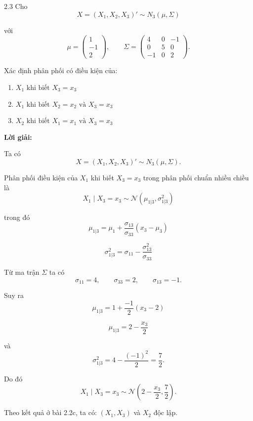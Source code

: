 \begin{question}{2.3}
Cho
\[
X = (X_1, X_2, X_3)' \sim N_3(\mu, \Sigma)
\]

với
\[
\mu =
\begin{pmatrix}
1\\
-1\\
2
\end{pmatrix},
\qquad
\Sigma =
\begin{pmatrix}
4 & 0 & -1\\
0 & 5 & 0\\
-1 & 0 & 2
\end{pmatrix}.
\]

Xác định phân phối có điều kiện của:

\begin{enumerate}
\item[(a)] $X_1 \text{ khi biết } X_3 = x_3$
\item[(b)] $X_1 \text{ khi biết } X_2 = x_2 \text{ và } X_3 = x_3$
\item[(c)] $X_2 \text{ khi biết } X_1 = x_1 \text{ và } X_3 = x_3$
\end{enumerate}

\textbf{Lời giải:}

\begin{subquestion}
\begin{answer}
Ta có
\[
X = (X_1, X_2, X_3)' \sim N_3(\mu,\Sigma).
\]

Phân phối điều kiện của $X_1$ khi biết $X_3=x_3$ trong phân phối chuẩn nhiều chiều là
\[
X_1 \mid X_3 = x_3 \sim \mathcal{N}(\mu_{1|3}, \sigma^2_{1|3})
\]

trong đó
\[
\mu_{1|3} = \mu_1 + \frac{\sigma_{13}}{\sigma_{33}}(x_3 - \mu_3)
\]

\[
\sigma^2_{1|3} = \sigma_{11} - \frac{\sigma_{13}^2}{\sigma_{33}}
\]

Từ ma trận $\Sigma$ ta có
\[
\sigma_{11}=4, \qquad \sigma_{33}=2, \qquad \sigma_{13}=-1.
\]

Suy ra
\[
\mu_{1|3} = 1 + \frac{-1}{2}(x_3-2)
\]

\[
\mu_{1|3} = 2 - \frac{x_3}{2}
\]

và
\[
\sigma^2_{1|3} = 4 - \frac{(-1)^2}{2} = \frac{7}{2}.
\]

Do đó
\[
X_1 \mid X_3 = x_3 \sim \mathcal{N}\left(2-\frac{x_3}{2}, \frac{7}{2}\right).
\]
\end{answer}
\end{subquestion} 

\begin{subquestion}
\begin{answer}
Theo kết quả ở bài 2.2c, ta có: $(X_1, X_3)$ và $X_2$ độc lập.


\end{answer}
\end{subquestion}
\end{question}
